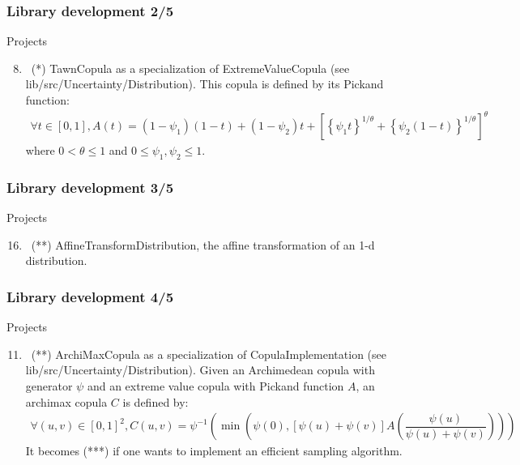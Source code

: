 \documentclass[8pt]{beamer}
\begin{document}
\begin{frame}
  \frametitle{Library development 2/5}
  \begin{block}{Projects}
    \begin{enumerate}
      \setcounter{enumi}{7}
    \item~(*) \alert{\ttfamily TawnCopula} as a specialization of {\ttfamily ExtremeValueCopula} (see {\ttfamily lib/src/Uncertainty/Distribution}). This copula is defined by its Pickand function:
      \begin{align}
        \forall t\in[0,1], A(t)=(1-\psi_1)(1-t)+(1-\psi_2)t+\left[\left\{\psi_1t\right\}^{1/\theta}+\left\{\psi_2(1-t)\right\}^{1/\theta}\right]^\theta
      \end{align}
      where $0<\theta\leq 1$ and $0\leq\psi_1,\psi_2\leq 1$.
    \end{enumerate}
  \end{block}
\end{frame}


\begin{frame}
  \frametitle{Library development 3/5}
  \begin{block}{Projects}
    \begin{enumerate}
      \setcounter{enumi}{15}
    \item~(**) \alert{\ttfamily AffineTransformDistribution}, the affine transformation of an 1-d distribution.
    \end{enumerate}
  \end{block}
\end{frame}


\begin{frame}
  \frametitle{Library development 4/5}
  \begin{block}{Projects}
    \begin{enumerate}
      \setcounter{enumi}{10}
    \item~(**) \alert{\ttfamily ArchiMaxCopula} as a specialization of {\ttfamily CopulaImplementation} (see {\ttfamily lib/src/Uncertainty/Distribution}). Given an Archimedean copula with generator $\psi$ and an extreme value copula with Pickand function $A$, an archimax copula $C$ is defined by:
      \begin{align}
        \forall (u,v)\in[0,1]^2, C(u,v)=\psi^{-1}\left(\min\left(\psi(0), [\psi(u)+\psi(v)]A\left(\dfrac{\psi(u)}{\psi(u)+\psi(v)}\right)\right)\right)
      \end{align}
      It becomes (***) if one wants to implement an efficient sampling algorithm.
    \end{enumerate}
  \end{block}
\end{frame}
\end{document}
